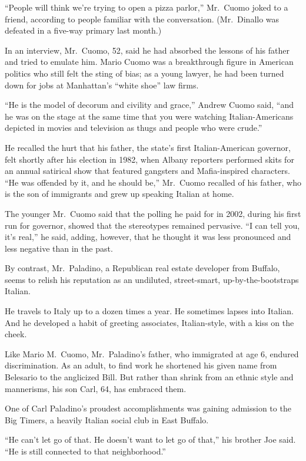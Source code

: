 ﻿\documentclass[12pt]{article}
\begin{document}
``People will think we're trying to open a pizza parlor,'' Mr.~Cuomo joked to a friend, according to
people familiar with the conversation. (Mr.~Dinallo was defeated in a five-way primary last month.)

In an interview, Mr.~Cuomo, 52, said he had absorbed the lessons of his father and tried to emulate
him. Mario Cuomo was a breakthrough figure in American politics who still felt the sting of bias; as
a young lawyer, he had been turned down for jobs at Manhattan's ``white shoe'' law firms.

``He is the model of decorum and civility and grace,'' Andrew Cuomo said, ``and he was on the stage
at the same time that you were watching Italian-Americans depicted in movies and television as thugs
and people who were crude.''

He recalled the hurt that his father, the state's first Italian-American governor, felt shortly
after his election in 1982, when Albany reporters performed skits for an annual satirical show that
featured gangsters and Mafia-inspired characters. ``He was offended by it, and he should be,''
Mr.~Cuomo recalled of his father, who is the son of immigrants and grew up speaking Italian at home.

The younger Mr.~Cuomo said that the polling he paid for in 2002, during his first run for governor,
showed that the stereotypes remained pervasive. ``I can tell you, it's real,'' he said, adding,
however, that he thought it was less pronounced and less negative than in the past.

By contrast, Mr.~Paladino, a Republican real estate developer from Buffalo, seems to relish his
reputation as an undiluted, street-smart, up-by-the-bootstraps Italian.

He travels to Italy up to a dozen times a year. He sometimes lapses into Italian. And he developed a
habit of greeting associates, Italian-style, with a kiss on the cheek.

Like Mario M.~Cuomo, Mr.~Paladino's father, who immigrated at age 6, endured discrimination. As an
adult, to find work he shortened his given name from Belesario to the anglicized Bill. But rather
than shrink from an ethnic style and mannerisms, his son Carl, 64, has embraced them.

One of Carl Paladino's proudest accomplishments was gaining admission to the Big Timers, a heavily
Italian social club in East Buffalo.

``He can't let go of that. He doesn't want to let go of that,'' his brother Joe said. ``He is still
connected to that neighborhood.''
\end{document}
